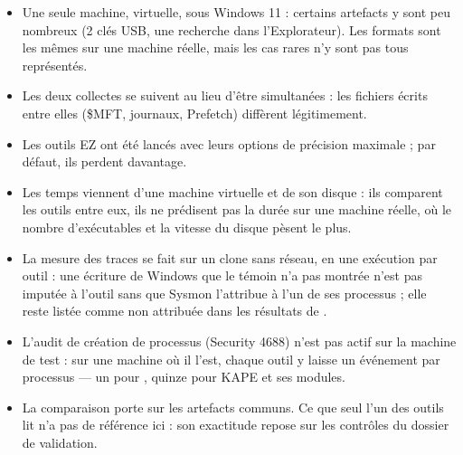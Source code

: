 \documentclass[11pt,a4paper,oneside]{report}
\begin{document}
\begin{itemize}
  \item Une seule machine, virtuelle, sous Windows 11 : certains artefacts y
        sont peu nombreux (2 clés USB, une recherche dans l'Explorateur). Les formats sont
        les mêmes sur une machine réelle, mais les cas rares n'y sont pas tous
        représentés.
  \item Les deux collectes se suivent au lieu d'être simultanées : les fichiers
        écrits entre elles (\$MFT, journaux, Prefetch) diffèrent légitimement.
  \item Les outils EZ ont été lancés avec leurs options de précision maximale ;
        par défaut, ils perdent davantage.
  \item Les temps viennent d'une machine virtuelle et de son disque : ils
        comparent les outils entre eux, ils ne prédisent pas la durée sur une
        machine réelle, où le nombre d'exécutables et la vitesse du disque
        pèsent le plus.
  \item La mesure des traces se fait sur un clone sans réseau, en une
        exécution par outil : une écriture de Windows que le témoin n'a pas
        montrée n'est pas imputée à l'outil sans que Sysmon l'attribue à l'un de
        ses processus ; elle reste listée comme non attribuée dans les résultats
        de .
  \item L'audit de création de processus (Security 4688) n'est pas actif sur la
        machine de test : sur une machine où il l'est, chaque outil y laisse un
        événement par processus --- un pour \wac{}, quinze pour KAPE et ses
        modules.
  \item La comparaison porte sur les artefacts communs. Ce que seul l'un des
        outils lit n'a pas de référence ici : son exactitude repose sur les
        contrôles du dossier de validation.
\end{itemize}
\end{document}
